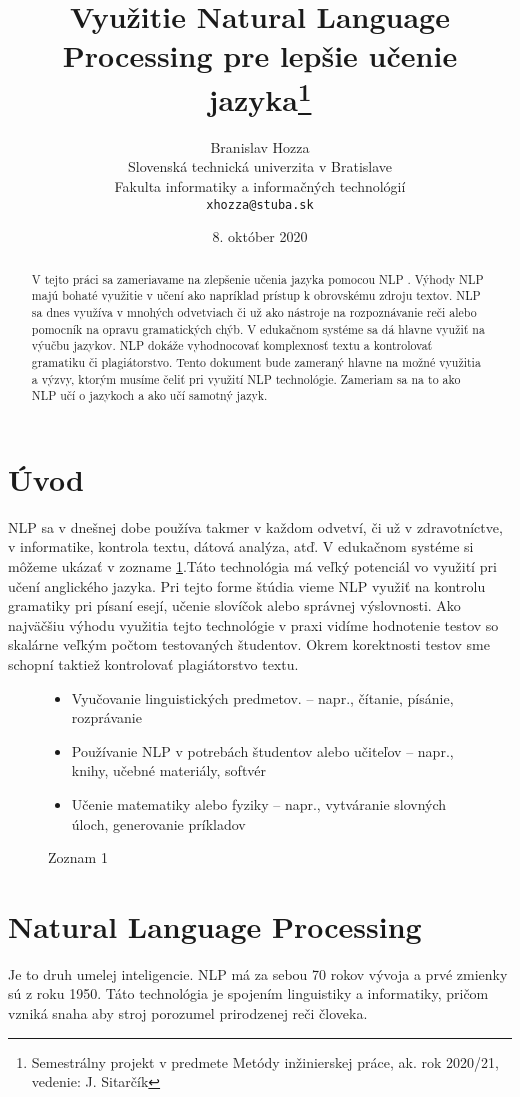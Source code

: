 \documentclass[10pt,twoside,slovak,a4paper]{article}
\title{Využitie Natural Language Processing pre lepšie učenie jazyka\thanks{Semestrálny projekt v predmete Metódy inžinierskej práce, ak. rok 2020/21, vedenie: J. Sitarčík}}
\author{Branislav Hozza\\[2pt]
	{\small Slovenská technická univerzita v Bratislave}\\
	{\small Fakulta informatiky a informačných technológií}\\
	{\small \texttt{xhozza@stuba.sk}}
	}
\date{\small 8. október 2020}
\begin{document}
\maketitle

\begin{abstract}
	V tejto práci sa zameriavame na zlepšenie učenia jazyka pomocou NLP \cite{NLP}. 
	Výhody NLP majú bohaté využitie v učení ako napríklad prístup k obrovskému zdroju textov. 
	NLP sa dnes využíva v mnohých odvetviach či už ako nástroje na rozpoznávanie reči alebo pomocník na opravu gramatických chýb. 
	V edukačnom systéme sa dá hlavne využiť na výučbu jazykov. NLP dokáže vyhodnocovať komplexnosť textu a kontrolovať gramatiku či plagiátorstvo. 
	Tento dokument bude zameraný hlavne na možné využitia a výzvy, ktorým musíme čeliť pri využití NLP technológie. 
	Zameriam sa na to ako NLP učí o jazykoch a ako učí samotný jazyk.
\end{abstract}

\section{Úvod}

NLP sa v dnešnej dobe používa takmer v každom odvetví, či už v zdravotníctve, v informatike, kontrola textu, dátová analýza, atď. 
V edukačnom systéme si môžeme ukázať v zozname \ref{zoznam_1}.Táto technológia má veľký potenciál vo využití pri učení anglického jazyka. 
Pri tejto forme štúdia vieme NLP využiť na kontrolu gramatiky pri písaní esejí, učenie slovíčok alebo správnej výslovnosti.
Ako najväčšiu výhodu využitia tejto technológie v praxi vidíme hodnotenie testov so skalárne veľkým počtom testovaných študentov. 
Okrem korektnosti testov sme schopní taktiež kontrolovať plagiátorstvo textu.
\begin{figure}[H]
	\centering
	\begin{itemize}\label{zoznam_1}
			\item Vyučovanie linguistických predmetov.
			– napr., čítanie, písánie, rozprávanie
			\item Používanie NLP v potrebách študentov alebo učiteľov
			– napr., knihy, učebné materiály, softvér
			\item Učenie matematiky alebo fyziky
			– napr., vytváranie slovných úloch, generovanie príkladov
			\end{itemize}
	\caption{Zoznam 1}
\end{figure}
\section{Natural Language Processing} \label{NLP}
Je to druh umelej inteligencie. NLP má za sebou 70 rokov vývoja a prvé zmienky sú z roku 1950\cite{historia}. Táto technológia je spojením linguistiky a informatiky, pričom vzniká snaha aby stroj porozumel prirodzenej reči človeka.
\end{document}
